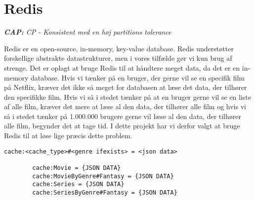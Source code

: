 \section{Redis}
\begin{displayquote}
    \textit{\textbf{CAP:} CP - Konsistent med en høj partitions tolerance}
\end{displayquote}

Redis er en open-source, in-memory, key-value database. Redis understøtter forskellige abstrakte datastrukturer, men i vores tilfælde gør vi kun brug af strenge. Det er oplagt at bruge Redis til at håndtere meget data, da det er en in-memory database. Hvis vi tænker på en bruger, der gerne vil se en specifik film på Netflix, kræver det ikke så meget for databasen at læse det data, der tilhører den specifikke film. Hvis vi så i stedet tænker på at en bruger gerne vil se en liste af alle film, kræver det mere at læse al den data, der tilhører alle film og hvis vi så i stedet tænker på 1.000.000 brugere gerne vil læse al den data, der tilhører alle film, begynder det at tage tid. I dette projekt har vi derfor valgt at bruge Redis til at løse lige præcis dette problem.
\begin{tcolorbox}
    \lstset{style=htmlstyle}
    \begin{lstlisting}[language={[Sharp]C}, caption={Logs HBASE Model}, label={lst:cache}]
        cache:<cache_type>#<genre ifexists> = <json data>

        cache:Movie = {JSON DATA}
        cache:MovieByGenre#Fantasy = {JSON DATA}
        cache:Series = {JSON DATA}
        cache:SeriesByGenre#Fantasy = {JSON DATA}
    \end{lstlisting}
\end{tcolorbox}
